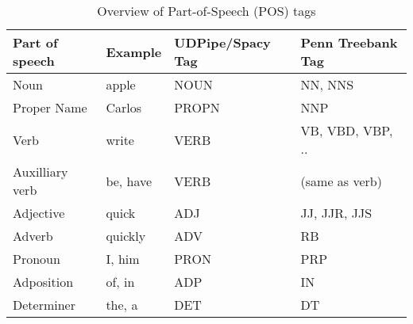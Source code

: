 \begin{table}
  \caption{\label{tab:postags}Overview of Part-of-Speech (POS) tags}{
  \begin{tabularx}{\textwidth}{llll}
    \toprule
    Part of speech & Example & UDPipe/Spacy Tag & Penn Treebank Tag \\
    \midrule
    Noun            & apple & NOUN & NN, NNS \\
    Proper Name     & Carlos & PROPN & NNP \\
    Verb            & write & VERB & VB, VBD, VBP, .. \\
    Auxilliary verb & be, have & VERB & (same as verb) \\
    Adjective       & quick & ADJ & JJ, JJR, JJS \\
    Adverb          & quickly & ADV & RB \\ 
    Pronoun         & I, him  & PRON & PRP \\
    Adposition      & of, in  & ADP & IN \\
    Determiner      & the, a & DET & DT \\
\bottomrule
  \end{tabularx}}{}
  \end{table}

